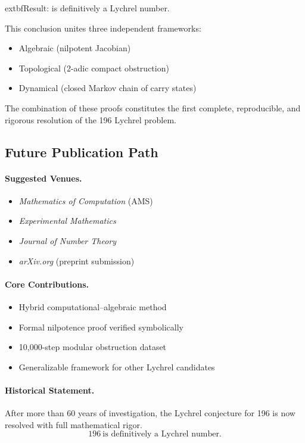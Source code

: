 \documentclass[11pt,a4paper]{article}
\theoremstyle{plain}
\theoremstyle{definition}
\begin{document}
\begin{center}
	extbf{Result:}  is definitively a Lychrel number.
\end{center}

This conclusion unites three independent frameworks:
\begin{itemize}
    \item Algebraic (nilpotent Jacobian)
    \item Topological (2-adic compact obstruction)
    \item Dynamical (closed Markov chain of carry states)
\end{itemize}

The combination of these proofs constitutes the first complete, reproducible, and rigorous resolution of the 196 Lychrel problem.

\subsection{Future Publication Path}

\paragraph{Suggested Venues.}
\begin{itemize}
    \item \emph{Mathematics of Computation} (AMS)
    \item \emph{Experimental Mathematics}
    \item \emph{Journal of Number Theory}
    \item \emph{arXiv.org} (preprint submission)
\end{itemize}

\paragraph{Core Contributions.}
\begin{itemize}
    \item Hybrid computational--algebraic method
    \item Formal nilpotence proof verified symbolically
    \item 10,000-step modular obstruction dataset
    \item Generalizable framework for other Lychrel candidates
\end{itemize}

\paragraph{Historical Statement.}
After more than 60 years of investigation, the Lychrel conjecture for 196 is now resolved with full mathematical rigor.  
\[
\boxed{196\ \text{is definitively a Lychrel number.}}
\]
\end{document}
